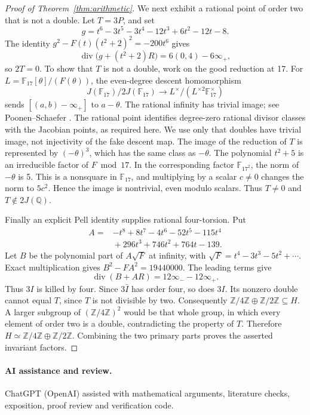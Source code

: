 \documentclass[11pt,reqno]{amsart}
\theoremstyle{remark}
\newcommand{\Q}{\mathbb Q}
\newcommand{\Z}{\mathbb Z}
\newcommand{\F}{\mathbb F}
\DeclareMathOperator{\divisor}{div}
\begin{document}
\begin{proof}[Proof of Theorem~\ref{thm:arithmetic}]
We next exhibit a rational point of order two that is not a double.
Let \(T=3P\), and set
\[
 g=t^6-3t^5-3t^4-12t^3+6t^2-12t-8.
\]
The identity \(g^2-F(t)(t^2+2)^2=-200t^6\) gives
\[
 \divisor\bigl(g+(t^2+2)R\bigr)=6(0,4)-6\infty_+,
\]
so \(2T=0\). To show that \(T\) is not a double, work on the good
reduction at 17. For \(L=\F_{17}[\theta]/(F(\theta))\), the
even-degree descent homomorphism
\[
 J(\F_{17})/2J(\F_{17})\longrightarrow
                  L^\times/(L^{\times2}\F_{17}^\times)
\]
sends \([(a,b)-\infty_+]\) to \(a-\theta\).
The rational infinity has trivial image; see
Poonen--Schaefer \cite[Section~5, Proposition~5.1 and (8)]{PS}.
The rational point identifies degree-zero rational divisor classes with
the Jacobian points, as required here. We use only that doubles have
trivial image, not injectivity of the fake descent map.
The image of the reduction of \(T\) is represented by
\((-\theta)^3\), which has the same class as \(-\theta\).
The polynomial \(t^2+5\) is an irreducible factor of \(F\bmod17\).
In the corresponding factor
\(\F_{17^2}\), the norm of \(-\theta\) is 5. This is a nonsquare in
\(\F_{17}\), and multiplying by a scalar \(c\ne0\) changes the norm
to \(5c^2\). Hence the image is nontrivial, even modulo scalars.
Thus \(T\ne0\) and \(T\notin2J(\Q)\).

Finally an explicit Pell identity supplies rational four-torsion.
Put
\[
\begin{split}
 A={}&-t^8+8t^7-4t^6-52t^5-115t^4\\
     &{}+296t^3+746t^2+764t-139.
\end{split}
\]
Let \(B\) be the polynomial part of \(A\sqrt F\) at infinity, with
\(\sqrt F=t^4-3t^3-5t^2+\cdots\). Exact multiplication gives
\(B^2-FA^2=19440000\).
The leading terms give
\[
 \divisor(B+AR)=12\infty_- -12\infty_+.
\]
Thus \(3I\) is killed by four. Since \(3\bar I\) has order four,
so does \(3I\). Its nonzero double cannot equal \(T\), since
\(T\) is not divisible by two. Consequently
\(\Z/4\Z\oplus\Z/2\Z\subseteq H\).
A larger subgroup of \((\Z/4\Z)^2\) would be that whole group,
in which every element of order two is a double, contradicting the
property of \(T\). Therefore \(H\simeq\Z/4\Z\oplus\Z/2\Z\).
Combining the two primary parts proves the asserted invariant factors.
\end{proof}

\paragraph{AI assistance and review.}
ChatGPT (OpenAI) assisted with mathematical arguments, literature checks,
exposition, proof review and verification code.
\end{document}
